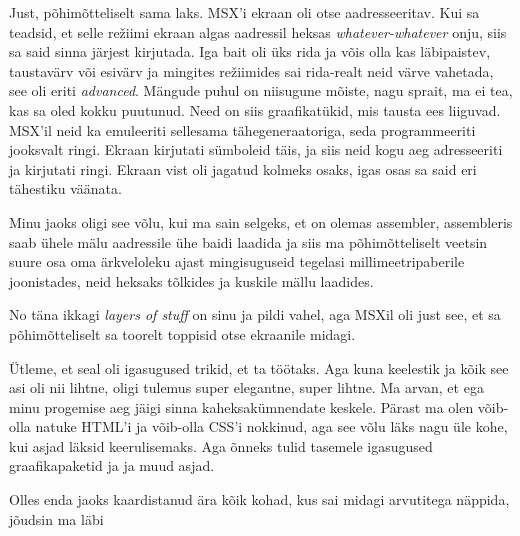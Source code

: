Just, põhimõtteliselt sama laks. MSX'i ekraan oli otse aadresseeritav. Kui sa teadsid, et selle režiimi ekraan algas aadressil heksas \emph{whatever-whatever} onju, siis sa said sinna järjest kirjutada. Iga bait oli üks rida ja võis olla kas läbipaistev, taustavärv või esivärv ja mingites režiimides sai rida-realt neid värve vahetada, see oli eriti \emph{advanced}. Mängude puhul on niisugune mõiste, nagu sprait, ma ei tea, kas sa oled kokku puutunud. Need on siis graafikatükid, mis tausta ees liiguvad. MSX'il neid ka emuleeriti sellesama tähegeneraatoriga, seda programmeeriti jooksvalt ringi. Ekraan kirjutati sümboleid täis, ja siis neid kogu aeg adresseeriti ja kirjutati ringi. Ekraan vist oli jagatud kolmeks osaks, igas osas sa said eri tähestiku väänata.

Minu jaoks oligi see võlu, kui ma sain selgeks, et on olemas assembler, assembleris saab ühele mälu aadressile ühe baidi laadida ja siis ma põhimõtteliselt veetsin suure osa oma ärkveloleku ajast mingisuguseid tegelasi  millimeetripaberile joonistades, neid heksaks tõlkides ja kuskile mällu laadides. 


No täna ikkagi \emph{layers of stuff} on sinu ja pildi vahel, aga MSXil oli just see, et sa põhimõtteliselt sa toorelt toppisid otse ekraanile midagi. 


Ütleme, et seal oli igasugused trikid, et ta töötaks. Aga kuna keelestik ja kõik see asi oli nii lihtne, oligi tulemus super elegantne, super  lihtne.  Ma arvan, et ega minu progemise aeg jäigi sinna kaheksakümnendate keskele. Pärast ma olen võib-olla natuke HTML'i ja võib-olla CSS'i nokkinud, aga see võlu läks nagu üle kohe, kui asjad läksid keerulisemaks. Aga õnneks tulid tasemele igasugused graafikapaketid ja ja muud asjad. 


Olles enda jaoks kaardistanud ära kõik kohad, kus sai midagi arvutitega näppida, jõudsin ma läbi

